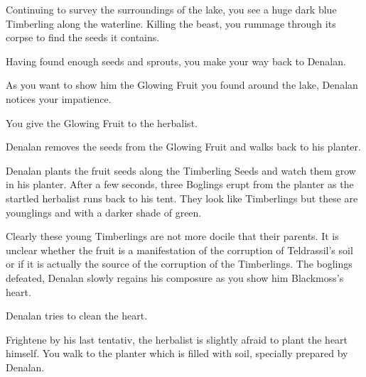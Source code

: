 
Continuing to survey the surroundings of the lake, you see a huge dark blue Timberling along the waterline. Killing the beast, you rummage through its corpse to find the seeds it contains.


Having found enough seeds and sprouts, you make your way back to Denalan.



As you want to show him the Glowing Fruit you found around the lake, Denalan notices your impatience.


You give the Glowing Fruit to the herbalist.


Denalan removes the seeds from the Glowing Fruit and walks back to his planter.


Denalan plants the fruit seeds along the Timberling Seeds and watch them grow in his planter. After a few seconds, three Boglings erupt from the planter as the startled herbalist runs back to his tent. They look like Timberlings but these are younglings and with a darker shade of green.


Clearly these young Timberlings are not more docile that their parents. It is unclear whether the fruit is a manifestation of the corruption of Teldrassil's soil or if it is actually the source of the corruption of the Timberlings. The boglings defeated, Denalan slowly regains his composure as you show him Blackmoss's heart.


Denalan tries to clean the heart.


Frightene by his last tentativ, the herbalist is slightly afraid to plant the heart himself. You walk to the planter which is filled with soil, specially prepared by Denalan.  %

